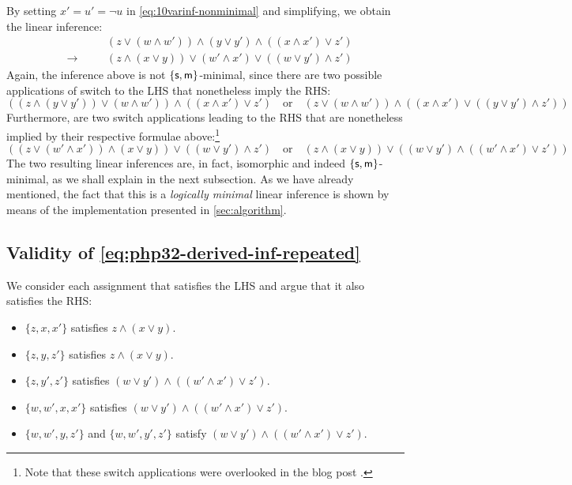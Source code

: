 \documentclass[a4paper, UKenglish, cleveref]{lipics-v2019}
\begin{document}
By setting $x' = u' = \lnot u$ in \eqref{eq:10varinf-nonminimal} and simplifying, we obtain the linear inference:
\begin{equation*}
\begin{alignedat}{2}
&&& (z \lor (w \land w')) \land (y \lor y') \land ((x \land x') \lor z') \\
&\to &\quad& (z \land (x \lor y)) \lor (w' \land x') \lor ((w \lor y') \land z')
\end{alignedat}
\end{equation*}
Again, the inference above is not $\{\mathsf{s},\mathsf{m}\}$-minimal, since there are two possible applications of switch to the LHS that nonetheless imply the RHS:
\[
((z \land (y \lor y')) \lor (w \land w')) \land ((x \land x') \lor z')
\quad
\text{or}
\quad
(z \lor (w \land w')) \land ((x \land x') \lor ((y \lor y') \land z'))
\]
Furthermore, are two switch applications leading to the RHS that are nonetheless implied by their respective formulae above:\footnote{Note that these switch applications were overlooked in the blog post \cite{Das20:lin-inf-size-8}.}
\[
((z \lor (w' \land x')) \land (x \lor y)) \lor ((w \lor y') \land z')
\quad
\text{or}
\quad
(z \land (x \lor y)) \lor ((w \lor y') \land ((w' \land x') \lor z'))
\]
The two resulting linear inferences are, in fact, isomorphic and indeed $\{\mathsf{s},\mathsf{m}\}$-minimal, as we shall explain in the next subsection.
%
As we have already mentioned, the fact that this is a \emph{logically minimal} linear inference is shown by means of the implementation presented in \cref{sec:algorithm}.

\subsection{Validity of \cref{eq:php32-derived-inf-repeated}}
\label{sec:app:validity-php32-derived}
We consider each assignment that satisfies the LHS and argue that it also satisfies the RHS:
\begin{itemize}
\item $\{z,x,x'\}$ satisfies $z\land (x \lor y)$.
\item $\{z,y,z'\}$ satisfies $z\land (x \lor y)$.
\item $\{z,y',z'\}$ satisfies $(w \lor y') \land ((w' \land x') \lor z')$.
\item $\{w, w', x, x'\}$ satisfies $(w \lor y') \land ((w' \land x') \lor z')$.
\item $\{w, w', y, z'\}$ and $\{w, w', y', z'\}$ satisfy $(w \lor y') \land ((w' \land x') \lor z')$.
\end{itemize}
\end{document}

